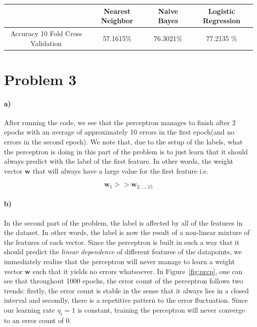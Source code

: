 \documentclass{article}
\begin{document}
\begin{table}[ht]
    \begin{center}
    \begin{tabular}{|c|c|c|c|}
   \hline
        & Nearest Neighbor & Naive Bayes & Logistic Regression \\ \hline
         Accuracy 10 Fold Cross Validation &  57.1615\%&76.3021\% &  77.2135 \%  \\ \hline
        \end{tabular}
    \end{center}
\end{table}


\section{Problem 3}

\paragraph{a)}
After running the code, we see that the perceptron manages to finish after $2$ epochs with an average of approximately 10 errors in the first epoch(and no errors in the second epoch). We note that, due to the setup of the labels, what the perceptron is doing in this part of the problem is to just learn that it should always predict with the label of the first feature. In other words, the weight vector $\mathbf{w}$ that will always have a large value for the first feature i.e.

\[
\mathbf{w}_1 >> \mathbf{w}_{2,\hdots,15} 
\]

\paragraph{b)}
In the second part of the problem, the label is affected by all of the features in the dataset. In other words, the label is now the result of a non-linear mixture of the features of each vector. Since the perceptron is built in such a way that it should predict the \textit{linear dependence} of different features of the datapoints, we immediately realize that the perceptron will never manage to learn a weight vector $\mathbf{w}$ such that it yields no errors whatsoever. In Figure~\ref{fig:prcp}, one can see that throughout 1000 epochs, the error count of the perceptron follows two trends: firstly, the error count is stable in the sense that it always lies in a closed interval and secondly, there is a repetitive pattern to the error fluctuation. Since our learning rate $\eta_i=1$ is constant, training the perceptron will never converge to an error count of 0.
\end{document}
